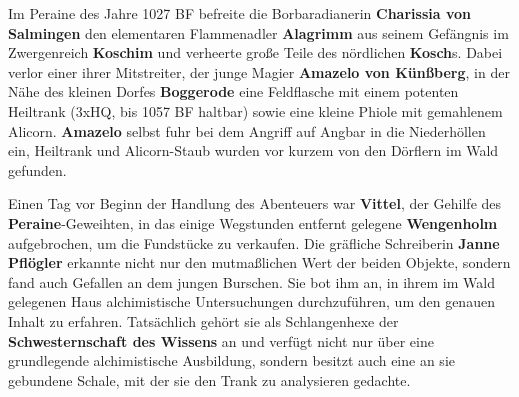 \neuespalte

Im Peraine des Jahre 1027 BF befreite die Borbaradianerin \textbf{Charissia von Salmingen} den elementaren Flammenadler \textbf{Alagrimm} aus seinem Gefängnis im Zwergenreich \textbf{Koschim} und verheerte große Teile des nördlichen \textbf{Kosch}s.
Dabei verlor einer ihrer Mitstreiter, der junge Magier \textbf{Amazelo von Künßberg}, in der Nähe des kleinen Dorfes \textbf{Boggerode} eine Feldflasche mit einem potenten Heiltrank (3xHQ, bis 1057 BF haltbar) sowie eine kleine Phiole mit gemahlenem Alicorn.
\textbf{Amazelo} selbst fuhr bei dem Angriff auf Angbar in die Niederhöllen ein, Heiltrank und Alicorn-Staub wurden vor kurzem von den Dörflern im Wald gefunden.

Einen Tag vor Beginn der Handlung des Abenteuers war \textbf{Vittel}, der Gehilfe des \textbf{Peraine}-Geweihten, in das einige Wegstunden entfernt gelegene \textbf{Wengenholm} aufgebrochen, um die Fundstücke zu verkaufen.
Die gräfliche Schreiberin \textbf{Janne Pflögler} erkannte nicht nur den mutmaßlichen Wert der beiden Objekte, sondern fand auch Gefallen an dem jungen Burschen.
Sie bot ihm an, in ihrem im Wald gelegenen Haus alchimistische Untersuchungen durchzuführen, um den genauen Inhalt zu erfahren.
Tatsächlich gehört sie als Schlangenhexe der \textbf{Schwesternschaft des Wissens} an und verfügt nicht nur über eine grundlegende alchimistische Ausbildung, sondern besitzt auch eine an sie gebundene Schale, mit der sie den Trank zu analysieren gedachte.

